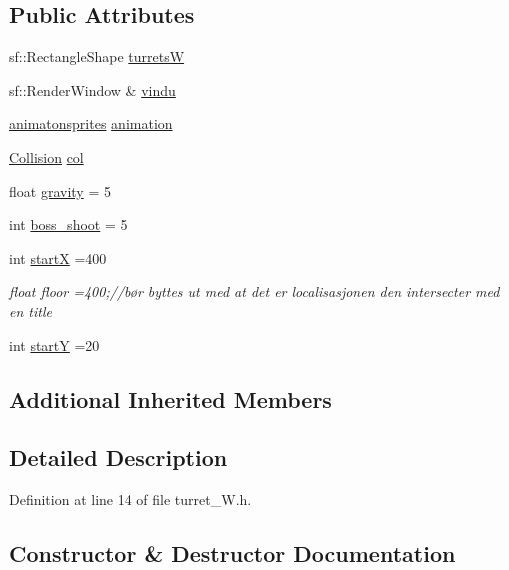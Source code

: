 \subsection*{Public Attributes}
\begin{DoxyCompactItemize}
\item 
sf\+::\+Rectangle\+Shape \hyperlink{classturret___w_a2537f62195a8cb57eac8d0c7b93062d3}{turretsW}
\item 
sf\+::\+Render\+Window \& \hyperlink{classturret___w_a5f2bc12dc323bcdb13db6df48a64e61f}{vindu}
\item 
\hyperlink{classanimatonsprites}{animatonsprites} \hyperlink{classturret___w_aa5e92e624406182b1b93ad3c35bf5da5}{animation}
\item 
\hyperlink{class_collision}{Collision} \hyperlink{classturret___w_a3d954941ca61aa3c1e43efa4314c1f29}{col}
\item 
float \hyperlink{classturret___w_ad524e24b02c9c34ee778265f99264a1f}{gravity} = 5
\item 
int \hyperlink{classturret___w_a51e29c8244f2e6a2b08106acf2e55332}{boss\+\_\+shoot} = 5
\item 
int \hyperlink{classturret___w_a9ae3df02b0fa517233e30ca31b8f59c6}{startX} =400
\begin{DoxyCompactList}\small\item\em float floor =400;//bør byttes ut med at det er localisasjonen den intersecter med en title \end{DoxyCompactList}\item 
int \hyperlink{classturret___w_adb9f5689156e17451806b3b3390a7d20}{startY} =20
\end{DoxyCompactItemize}
\subsection*{Additional Inherited Members}


\subsection{Detailed Description}


Definition at line 14 of file turret\+\_\+\+W.\+h.



\subsection{Constructor \& Destructor Documentation}
\hypertarget{classturret___w_a9906ad4c139427379b42cff8b84eefa4}{}\label{classturret___w_a9906ad4c139427379b42cff8b84eefa4} 
